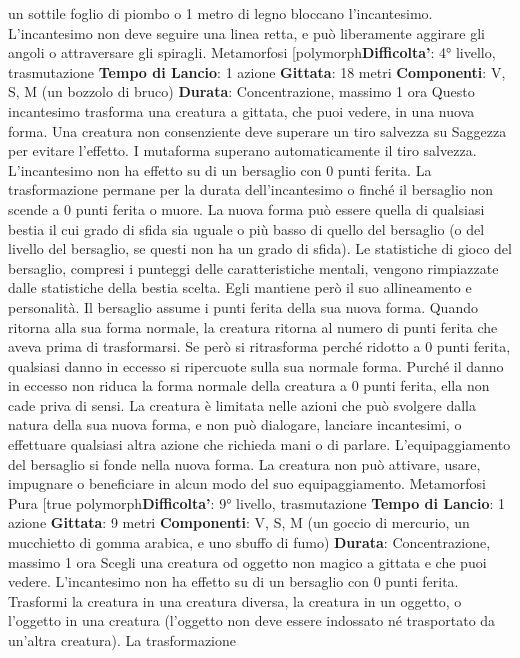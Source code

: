 \begin{multicols}{2}
un sottile foglio di piombo o 1 metro di legno bloccano
l’incantesimo. L’incantesimo non deve seguire una linea
retta, e può liberamente aggirare gli angoli o
attraversare gli spiragli.
Metamorfosi
[polymorph\textbf{Difficolta'}:
4° livello, trasmutazione
\textbf{Tempo di Lancio}: 1 azione
\textbf{Gittata}: 18 metri
\textbf{Componenti}: V, S, M (un bozzolo di bruco)
\textbf{Durata}: Concentrazione, massimo 1 ora
Questo incantesimo trasforma una creatura a gittata,
che puoi vedere, in una nuova forma. Una creatura non
consenziente deve superare un tiro salvezza su
Saggezza per evitare l’effetto. I mutaforma superano
automaticamente il tiro salvezza. L’incantesimo non ha
effetto su di un bersaglio con 0 punti ferita.
La trasformazione permane per la durata
dell’incantesimo o finché il bersaglio non scende a 0
punti ferita o muore. La nuova forma può essere quella
di qualsiasi bestia il cui grado di sfida sia uguale o più
basso di quello del bersaglio (o del livello del bersaglio,
se questi non ha un grado di sfida). Le statistiche di
gioco del bersaglio, compresi i punteggi delle
caratteristiche mentali, vengono rimpiazzate dalle 
statistiche della bestia scelta. Egli mantiene però il suo
allineamento e personalità.
Il bersaglio assume i punti ferita della sua nuova forma.
Quando ritorna alla sua forma normale, la creatura
ritorna al numero di punti ferita che aveva prima di
trasformarsi. Se però si ritrasforma perché ridotto a 0
punti ferita, qualsiasi danno in eccesso si ripercuote
sulla sua normale forma. Purché il danno in eccesso
non riduca la forma normale della creatura a 0 punti
ferita, ella non cade priva di sensi.
La creatura è limitata nelle azioni che può svolgere
dalla natura della sua nuova forma, e non può
dialogare, lanciare incantesimi, o effettuare qualsiasi
altra azione che richieda mani o di parlare.
L’equipaggiamento del bersaglio si fonde nella nuova
forma. La creatura non può attivare, usare, impugnare o
beneficiare in alcun modo del suo equipaggiamento.
Metamorfosi Pura
[true polymorph\textbf{Difficolta'}:
9° livello, trasmutazione
\textbf{Tempo di Lancio}: 1 azione
\textbf{Gittata}: 9 metri
\textbf{Componenti}: V, S, M (un goccio di mercurio, un
mucchietto di gomma arabica, e uno sbuffo di fumo)
\textbf{Durata}: Concentrazione, massimo 1 ora
Scegli una creatura od oggetto non magico a gittata e
che puoi vedere. L’incantesimo non ha effetto su di un
bersaglio con 0 punti ferita. Trasformi la creatura in una
creatura diversa, la creatura in un oggetto, o l’oggetto in
una creatura (l’oggetto non deve essere indossato né
trasportato da un’altra creatura). La trasformazione

\end{multicols}

